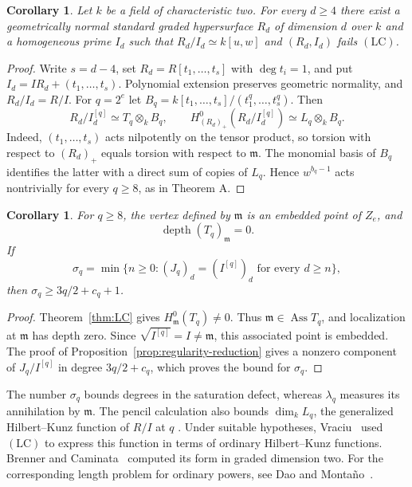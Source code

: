 \documentclass[11pt,a4paper,reqno]{amsart}
\numberwithin{equation}{section}
\theoremstyle{plain}
\newtheorem{corollary}[theorem]{Corollary}
\theoremstyle{definition}
\theoremstyle{remark}
\newcommand{\mm}{\mathfrak m}
\DeclareMathOperator{\Ass}{Ass}
\DeclareMathOperator{\depth}{depth}
\begin{document}
\begin{corollary}\label{cor:dimension}
Let $k$ be a field of characteristic two. For every $d\geq4$ there
exist a geometrically normal standard graded hypersurface $R_d$ of
dimension $d$ over $k$ and a homogeneous prime $I_d$ such that
$R_d/I_d\simeq k[u,w]$ and $(R_d,I_d)$ fails $(\mathrm{LC})$.
\end{corollary}
\begin{proof}
Write $s=d-4$, set $R_d=R[t_1,\ldots,t_s]$ with $\deg t_i=1$,
and put $I_d=IR_d+(t_1,\ldots,t_s)$. Polynomial extension preserves
geometric normality, and $R_d/I_d=R/I$. For $q=2^e$ let
$B_q=k[t_1,\ldots,t_s]/(t_1^q,\ldots,t_s^q)$. Then
\[
 R_d/I_d^{[q]}\simeq T_q\otimes_k B_q,\qquad
 H^0_{(R_d)_+}(R_d/I_d^{[q]})\simeq L_q\otimes_k B_q.
\]
Indeed, $(t_1,\ldots,t_s)$ acts nilpotently on the tensor product,
so torsion with respect to $(R_d)_+$ equals torsion with respect to
$\mm$. The monomial basis of $B_q$ identifies the latter with a
direct sum of copies of $L_q$. Hence $w^{b_q-1}$ acts nontrivially
for every $q\geq8$, as in Theorem A.
\end{proof}

\begin{corollary}\label{cor:vertex-saturation}
For $q\geq8$, the vertex defined by $\mm$ is an embedded point of $Z_e$, and
\[
\depth(T_q)_{\mathfrak m}=0.
\]
If
\[
\sigma_q=\min\{n\geq0:(J_q)_d=(I^{[q]})_d
                   \text{ for every }d\geq n\},
\]
then $\sigma_q\geq3q/2+c_q+1$.
\end{corollary}
\begin{proof}
Theorem~\ref{thm:LC} gives $H^0_{\mathfrak m}(T_q)\ne0$.
Thus $\mathfrak m\in\Ass T_q$, and localization at $\mathfrak m$ has
depth zero. Since $\sqrt{I^{[q]}}=I\ne\mathfrak m$, this associated
point is embedded. The proof of Proposition~\ref{prop:regularity-reduction}
gives a nonzero component of $J_q/I^{[q]}$ in degree $3q/2+c_q$,
which proves the bound for $\sigma_q$.
\end{proof}

The number $\sigma_q$ bounds degrees in the saturation defect, whereas
$\lambda_q$ measures its annihilation by $\mathfrak m$.
The pencil calculation also bounds $\dim_k L_q$, the generalized
Hilbert--Kunz function of $R/I$ at $q$ \cite{EpsteinYao,DaoSmirnov}.
Under suitable hypotheses, Vraciu~\cite{VraciuGHK} used $(\mathrm{LC})$
to express this function in terms of ordinary Hilbert--Kunz functions.
Brenner and Caminata~\cite{BC} computed its form in graded dimension two.
For the corresponding length problem for ordinary powers, see
Dao and Monta\~no~\cite{DaoMontano}.
\end{document}
